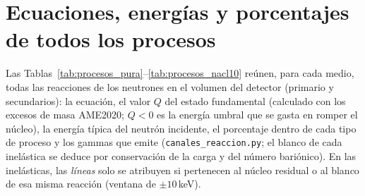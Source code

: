 \documentclass[11pt,a4paper]{article}
\begin{document}
\section{Ecuaciones, energías y porcentajes de todos los procesos}\label{sec:procesos}
Las Tablas~\ref{tab:procesos_pura}--\ref{tab:procesos_nacl10} reúnen, para cada medio, todas las reacciones de los neutrones en el volumen del detector (primario y secundarios): la ecuación,
el valor $Q$ del estado fundamental (calculado con los excesos de masa AME2020; $Q<0$ es la energía umbral que se gasta en romper el núcleo), la energía típica del neutrón incidente,
el porcentaje dentro de cada tipo de proceso y los gammas que emite (\texttt{canales\_reaccion.py}; el blanco de cada inelástica se deduce por conservación de la carga y del número bariónico).
En las inelásticas, las \emph{líneas} solo se atribuyen si pertenecen al núcleo residual o al blanco de esa misma reacción (ventana de $\pm10$\,keV).
\end{document}

